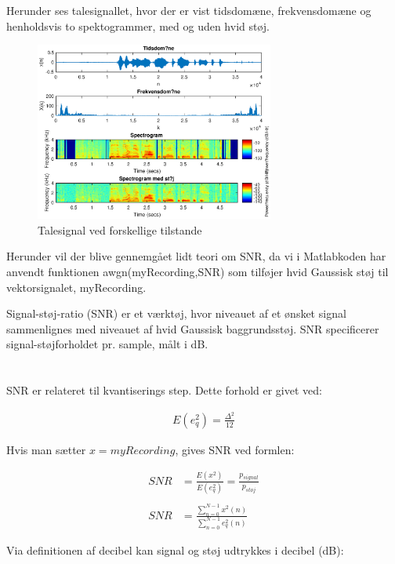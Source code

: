 \documentclass[a4paper]{report}
\begin{document}
Herunder ses talesignallet, hvor der er vist tidsdomæne, frekvensdomæne og henholdsvis to spektogrammer, med og uden hvid støj.

\begin{figure}[H] 
\centering
\includegraphics[width=0.7\textwidth]{grafer/White_noise_60}
\caption{Talesignal ved forskellige tilstande} \label{White_noise_60}
\end{figure}

Herunder vil der blive gennemgået lidt teori om SNR, da vi i Matlabkoden har anvendt funktionen awgn(myRecording,SNR) som tilføjer hvid Gaussisk støj til vektorsignalet, myRecording. 

Signal-støj-ratio (SNR) er et værktøj, hvor niveauet af et ønsket signal sammenlignes med niveauet af hvid Gaussisk baggrundsstøj. SNR specificerer signal-støjforholdet pr. sample, målt i dB.\\
\\
\\

SNR er relateret til kvantiserings step. Dette forhold er givet ved: 

\begin{align}
E(e_q^2) = \frac{\Delta^2}{12}
\end{align}

Hvis man sætter $x=myRecording$, gives SNR ved formlen: 

\begin{align}
SNR &= \frac{E(x^2)}{E(e_q^2)}=\frac{p_{signal}}{p_{støj}}\\
\\
SNR &= \frac{\sum\limits_{n=0}^{N-1} x^2(n)}{\sum\limits_{n=0}^{N-1} e_{q}^2(n)}
\end{align}

Via definitionen af ​​decibel kan signal og støj udtrykkes i decibel (dB): 
\end{document}
